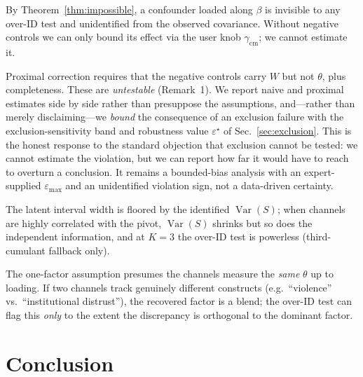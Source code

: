 \documentclass[11pt]{article}
\theoremstyle{definition}
\theoremstyle{remark}
\newcommand{\Var}{\operatorname{Var}}
\newcommand{\eps}{\varepsilon}
\begin{document}
\begin{description}[leftmargin=0em,itemsep=3pt]
\item[Common-mode blind spot.] By Theorem~\ref{thm:impossible}, a confounder
loaded along $\beta$ is invisible to any over-ID test and unidentified from
the observed covariance. Without negative controls we can only bound its
effect via the user knob $\gamma_{\text{cm}}$; we cannot estimate it.
\item[Untestable control exclusion.] Proximal correction requires that the
negative controls carry $W$ but not $\theta$, plus completeness. These are
\emph{untestable} (Remark~1). We report naive and proximal estimates side by
side rather than presuppose the assumptions, and---rather than merely
disclaiming---we \emph{bound} the consequence of an exclusion failure with the
exclusion-sensitivity band and robustness value $\eps^\star$ of
Sec.~\ref{sec:exclusion}. This is the honest response to the standard objection
that exclusion cannot be tested: we cannot estimate the violation, but we can
report how far it would have to reach to overturn a conclusion. It remains a
bounded-bias analysis with an expert-supplied $\eps_{\max}$ and an unidentified
violation sign, not a data-driven certainty.
\item[Resolution ceiling.] The latent interval width is floored by the
identified $\Var(S)$; when channels are highly correlated with the pivot,
$\Var(S)$ shrinks but so does the independent information, and at $K=3$ the
over-ID test is powerless (third-cumulant fallback only).
\item[Different constructs.] The one-factor assumption presumes the channels
measure the \emph{same} $\theta$ up to loading. If two channels track
genuinely different constructs (e.g.\ ``violence'' vs.\ ``institutional
distrust''), the recovered factor is a blend; the over-ID test can flag this
\emph{only} to the extent the discrepancy is orthogonal to the dominant
factor.
\end{description}

\section{Conclusion}\label{sec:conclusion}
\end{document}
